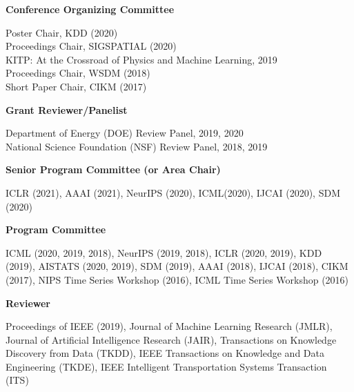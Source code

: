 \documentclass[margin,line]{res}
\newenvironment{list2}{
  \begin{list}{$\bullet$}{%
      \setlength{\itemsep}{0in}
      \setlength{\parsep}{0in} \setlength{\parskip}{0in}
      \setlength{\topsep}{0in} \setlength{\partopsep}{0in} 
      \setlength{\leftmargin}{0.2in}}}{\end{list}}
\begin{document}
\begin{resume}
{\bf Conference Organizing Committee}

Poster Chair, KDD (2020) \\
Proceedings Chair, SIGSPATIAL (2020) \\
KITP: At the Crossroad of Physics and Machine Learning,  2019\\
Proceedings Chair, WSDM (2018)\\
Short Paper Chair, CIKM (2017)

{\bf Grant Reviewer/Panelist}

 Department of Energy (DOE) Review Panel, 2019, 2020 \\
National Science Foundation (NSF) Review Panel, 2018, 2019



{\bf Senior Program Committee (or Area Chair)}

ICLR (2021), AAAI (2021), NeurIPS (2020), ICML(2020), IJCAI (2020), SDM (2020)

{\bf Program Committee}

ICML (2020, 2019, 2018), NeurIPS (2019, 2018), ICLR (2020, 2019), KDD (2019), AISTATS (2020, 2019), SDM (2019), AAAI (2018), IJCAI (2018), CIKM (2017), NIPS Time Series Workshop (2016), ICML Time Series Workshop (2016) 


{\bf Reviewer}

Proceedings of IEEE (2019), Journal of Machine Learning Research (JMLR), Journal of Artificial Intelligence Research (JAIR), Transactions on Knowledge Discovery from Data (TKDD), IEEE Transactions on Knowledge and Data Engineering (TKDE),  IEEE Intelligent Transportation Systems Transaction (ITS)




%


%
%
%
%



\end{resume}
\end{document}
